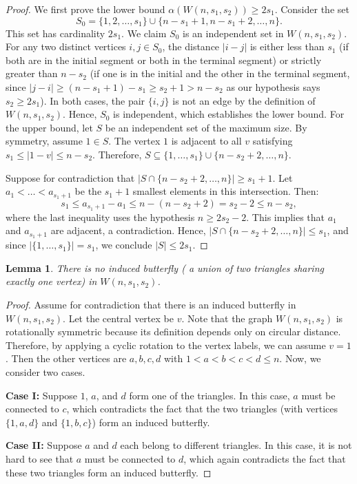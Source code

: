 \documentclass[preprint,12pt,3p]{elsarticle}
\newtheorem{lemma}[theorem]{Lemma}
\begin{document}
\begin{proof}
We first prove the lower bound $\alpha(W(n, s_1, s_2)) \geq 2s_1$. Consider the set
\[
S_0 = \{1, 2, \dots, s_1\} \cup \{n - s_1 + 1, n - s_1 + 2, \dots, n\}.
\]
This set has cardinality $2s_1$. We claim $S_0$ is an independent set in $W(n, s_1, s_2)$. For any two distinct vertices $i, j \in S_0$, the distance $|i - j|$ is either less than $s_1$ (if both are in the initial segment or both in the terminal segment) or strictly greater than $n - s_2$ (if one is in the initial and the other in the terminal segment, since $|j-i| \geq (n-s_1+1)-s_1\geq  s_2 +1 > n-s_2$ as our hypothesis says $s_2 \geq 2s_1$). In both cases, the pair $\{i, j\}$ is not an edge by the definition of $W(n, s_1, s_2)$. Hence, $S_0$ is independent, which establishes the lower bound. For the upper bound, let $S$ be an independent set of the maximum size. By symmetry, assume $1 \in S$. The vertex $1$ is adjacent to all $v$ satisfying $s_1 \leq |1-v| \leq n-s_2$. Therefore, $S\subseteq \{1,\ldots,s_1\} \cup \{n-s_2+2,\ldots,n\}$.

Suppose for contradiction that $|S \cap \{n-s_2+2,\ldots,n\}| \geq s_1+1$. Let $a_1 < \ldots < a_{s_1+1}$ be the $s_1+1$ smallest elements in this intersection. Then:
\[
s_1 \leq a_{s_1+1} - a_1 \leq n - (n-s_2+2) = s_2 - 2 \leq n - s_2,
\]
where the last inequality uses the hypothesis $n \geq 2s_2-2$. This implies that $a_1$ and $a_{s_1+1}$ are adjacent, a contradiction. Hence, $|S \cap \{n-s_2+2,\ldots,n\}| \leq s_1$, and since $|\{1,\ldots,s_1\}| = s_1$, we conclude $|S| \leq 2s_1$.
\end{proof}


\begin{lemma}\label{Lemma:  Butterfly}
There is no induced butterfly ( a union of two triangles sharing exactly one vertex) in $W(n, s_1, s_2)$.
\end{lemma}
\begin{proof}
Assume for contradiction that there is an induced butterfly in $W(n, s_1, s_2)$. Let the central vertex be $v$. Note that the graph $W(n, s_1, s_2)$ is rotationally symmetric because its definition depends only on circular distance. Therefore, by applying a cyclic rotation to the vertex labels, we can assume $v = 1$. Then the other vertices are $a, b, c, d$ with $1 < a < b < c < d \leq n$. Now, we consider two cases.

\textbf{Case I:} Suppose $1$, $a$, and $d$ form one of the triangles. In this case, $a$ must be connected to $c$, which contradicts the fact that the two triangles (with vertices $\{1, a, d\}$ and $\{1, b, c\}$) form an induced butterfly.

\textbf{Case II:} Suppose $a$ and $d$ each belong to different triangles. In this case, it is not hard to see that $a$ must be connected to $d$, which again contradicts the fact that these two triangles form an induced butterfly.
\end{proof}
\end{document}
